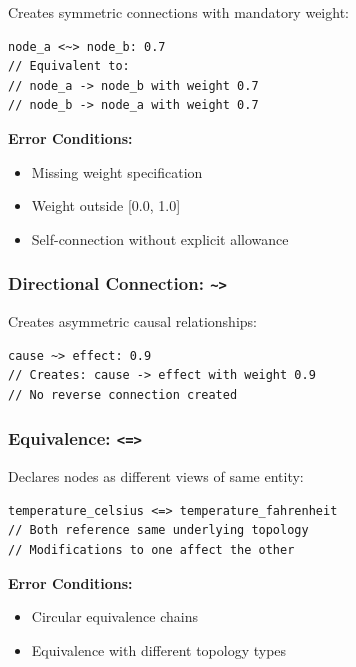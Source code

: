 \documentclass[12pt,a4paper,openany]{book} %
\begin{document}
Creates symmetric connections with mandatory weight:

\vspace{0.5em}
\begin{lstlisting}[language=loom]
node_a <~> node_b: 0.7
// Equivalent to:
// node_a -> node_b with weight 0.7
// node_b -> node_a with weight 0.7
\end{lstlisting}
\vspace{0.5em}

\textbf{Error Conditions:}
\begin{itemize}
\item Missing weight specification
\item Weight outside [0.0, 1.0]
\item Self-connection without explicit allowance
\end{itemize}

\subsubsection{Directional Connection: \texttt{\textasciitilde{}>}}

Creates asymmetric causal relationships:

\vspace{0.5em}
\begin{lstlisting}[language=loom]
cause ~> effect: 0.9
// Creates: cause -> effect with weight 0.9
// No reverse connection created
\end{lstlisting}
\vspace{0.5em}

\subsubsection{Equivalence: \texttt{<=>}}

Declares nodes as different views of same entity:

\vspace{0.5em}
\begin{lstlisting}[language=loom]
temperature_celsius <=> temperature_fahrenheit
// Both reference same underlying topology
// Modifications to one affect the other
\end{lstlisting}
\vspace{0.5em}

\textbf{Error Conditions:}
\begin{itemize}
\item Circular equivalence chains
\item Equivalence with different topology types
\end{itemize}
\end{document}
